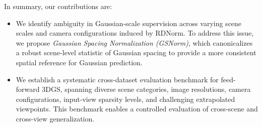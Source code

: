 In summary, our contributions are:

\vspace{-0.05in}

\begin{itemize}
    \item
    We identify ambiguity in Gaussian-scale supervision across varying
    scene scales and camera configurations induced by RDNorm. To address
    this issue, we propose \emph{Gaussian Spacing Normalization (GSNorm)},
    which canonicalizes a robust scene-level statistic of Gaussian spacing
    to provide a more consistent spatial reference for Gaussian prediction.

    \item
    We establish a systematic cross-dataset evaluation benchmark for
    feed-forward 3DGS, spanning diverse scene categories, image
    resolutions, camera configurations, input-view sparsity levels, and
    challenging extrapolated viewpoints. This benchmark enables a
    controlled evaluation of cross-scene and cross-view generalization.
\end{itemize}